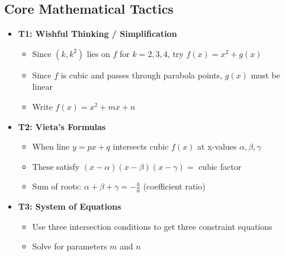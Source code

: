 \documentclass[]{article}
\begin{document}
\begin{tacticalbox}
\subsection*{Core Mathematical Tactics}
\begin{itemize}[leftmargin=*]
    \item \textbf{T1: Wishful Thinking / Simplification}
    \begin{itemize}
        \item Since $(k, k^2)$ lies on $f$ for $k = 2, 3, 4$, try $f(x) = x^2 + g(x)$
        \item Since $f$ is cubic and passes through parabola points, $g(x)$ must be linear
        \item Write $f(x) = x^2 + mx + n$
    \end{itemize}
    
    \item \textbf{T2: Vieta's Formulas}
    \begin{itemize}
        \item When line $y = px + q$ intersects cubic $f(x)$ at x-values $\alpha, \beta, \gamma$
        \item These satisfy $(x-\alpha)(x-\beta)(x-\gamma) = $ cubic factor
        \item Sum of roots: $\alpha + \beta + \gamma = -\frac{b}{a}$ (coefficient ratio)
    \end{itemize}
    
    \item \textbf{T3: System of Equations}
    \begin{itemize}
        \item Use three intersection conditions to get three constraint equations
        \item Solve for parameters $m$ and $n$
    \end{itemize}
\end{itemize}
\end{tacticalbox}
\end{document}
